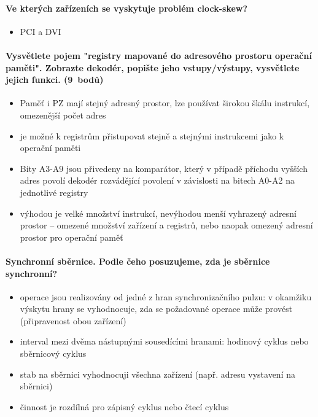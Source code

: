\documentclass[a5paper,10pt]{article}
\begin{document}
\paragraph{Ve kterých zařízeních se vyskytuje problém clock-skew?}
\begin{itemize}
	\item PCI a DVI
\end{itemize}

\paragraph{Vysvětlete pojem "registry mapované do adresového prostoru operační paměti". Zobrazte dekodér, popište jeho vstupy/výstupy, vysvětlete jejich funkci. \hfill (9~bodů)}
\begin{itemize}
	\item Paměť i PZ mají stejný adresný prostor, lze používat širokou škálu instrukcí, omezenější počet adres
	\item je možné k registrům přistupovat stejně a stejnými instrukcemi jako k operační paměti
	\item Bity A3-A9 jsou přivedeny na komparátor, který v případě příchodu vyšších adres povolí dekodér rozvádějící povolení v závislosti na bitech A0-A2 na jednotlivé registry
	\item výhodou je velké množství instrukcí, nevýhodou menší vyhrazený adresní prostor -- omezené množství zařízení a registrů, nebo naopak omezený adresní prostor pro operační paměť
\end{itemize}

\paragraph{Synchronní sběrnice. Podle čeho posuzujeme, zda je sběrnice synchronní?}
\begin{itemize}
	\item operace jsou realizovány od jedné z hran synchronizačního pulzu: v okamžiku výskytu hrany se vyhodnocuje, zda se požadované operace může provést (připravenost obou zařízení)
	\item interval mezi dvěma nástupnými sousedícími hranami: hodinový cyklus nebo sběrnicový cyklus
	\item stab na sběrnici vyhodnocuji všechna zařízení (např. adresu vystavení na sběrnici)
	\item činnost je rozdílná pro zápisný cyklus nebo čtecí cyklus
\end{itemize}
\end{document}
